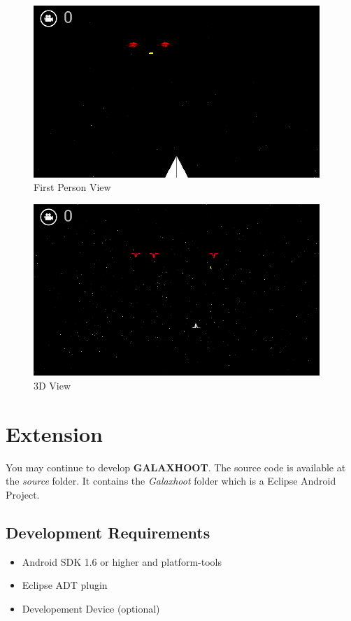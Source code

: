 \documentclass[12pt,a4paper]{article}
\begin{document}
\begin{figure}[h]
\centering 
  \includegraphics[height=65mm]{images/1stpersonview.png}
  \caption{First Person View}
\end{figure}
\newpage
\begin{figure}[h]
\centering 
  \includegraphics[height=65mm]{images/3Dview.png}
  \caption{3D View}
\end{figure}



\newpage
\section{Extension}
You may continue to develop \textbf{GALAXHOOT}. The source code is available at the \textit{source} folder. It contains the \textit{Galaxhoot} folder which is a Eclipse Android Project.

\subsection{Development Requirements}
\begin{itemize}
\item Android SDK 1.6 or higher and platform-tools
\item Eclipse ADT plugin
\item Developement Device (optional)
\end{itemize}
\end{document}
